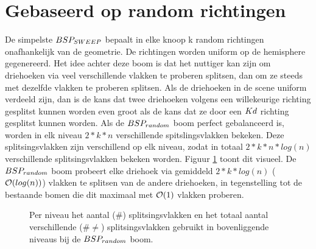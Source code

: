 \section{Gebaseerd op random richtingen}
De simpelste $BSP_{SWEEP}$ bepaalt in elke knoop k random richtingen onafhankelijk van de geometrie.
De richtingen worden uniform op de hemisphere gegenereerd.
Het idee achter deze boom is dat het nuttiger kan zijn om driehoeken via veel verschillende vlakken te proberen splitsen, dan om ze steeds met dezelfde vlakken te proberen splitsen.
Als de driehoeken in de scene uniform verdeeld zijn, dan is de kans dat twee driehoeken volgens een willekeurige richting gesplitst kunnen worden even groot als de kans dat ze door een $Kd$ richting gesplitst kunnen worden.
Als de $BSP_{random}$ boom perfect gebalanceerd is, worden in elk niveau $2*k*n$ verschillende spitslingsvlakken bekeken.
Deze splitsingsvlakken zijn verschillend op elk niveau, zodat in totaal $2*k*n*log(n)$ verschillende splitsingsvlakken bekeken worden.
Figuur \ref{fig:splitsingsvlakken-bsprandom} toont dit visueel.
De $BSP_{random}$ boom probeert elke driehoek via gemiddeld $2*k*log(n)$ ($\mathcal{O}(log(n))$) vlakken te splitsen van de andere driehoeken, in tegenstelling tot de bestaande bomen die dit maximaal met $\mathcal{O}(1)$ vlakken proberen.\\

\begin{figure}
   \caption{Per niveau het aantal ($\#$) splitsingsvlakken en het totaal aantal verschillende ($\# \neq$) splitsingsvlakken gebruikt in bovenliggende niveaus bij de $BSP_{random}$ boom.} %
   \label{fig:splitsingsvlakken-bsprandom}
\end{figure}


